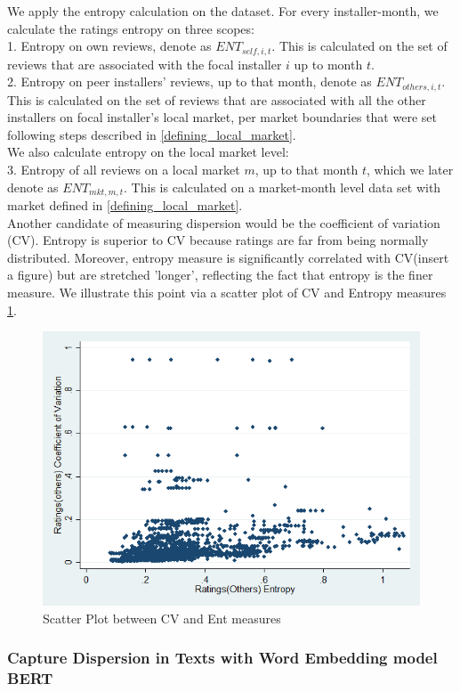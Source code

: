 \documentclass[msom,blindrev]{informs3}
\begin{document}
We apply the entropy calculation on the dataset. For every installer-month, we calculate the ratings entropy on three scopes: \\
1. Entropy on own reviews, denote as $ENT_{self,i,t}$. This is calculated on the set of reviews that are associated with the focal installer $i$ up to month $t$.  \\
2. Entropy on peer installers' reviews, up to that month, denote as $ENT_{others,i,t}$. This is calculated on the set of reviews that are associated with all the other installers on focal installer's local market, per market boundaries that were set following steps described in \ref{defining_local_market}.  \\
We also calculate entropy on the local market level:\\
3. Entropy of all reviews on a local market $m$, up to that month $t$, which we later denote as $ENT_{mkt,m,t}$. This is calculated on a market-month level data set with market defined in \ref{defining_local_market}. \\
Another candidate of measuring dispersion would be the coefficient of variation (CV). Entropy is superior to CV because ratings are far from being normally distributed. Moreover, entropy measure is significantly correlated with CV(insert a figure) but are stretched 'longer', reflecting the fact that entropy is the finer measure. We illustrate this point via a scatter plot of CV and Entropy measures \ref{scatter_cv_ent_others}.
\begin{figure}
	\centering
	\includegraphics[width=0.7\linewidth]{scatter_cv_ent_others.png}
	\caption{Scatter Plot between CV and Ent measures}
	\label{scatter_cv_ent_others}
\end{figure}

\subsubsection{Capture Dispersion in Texts with Word Embedding model BERT}
\end{document}
